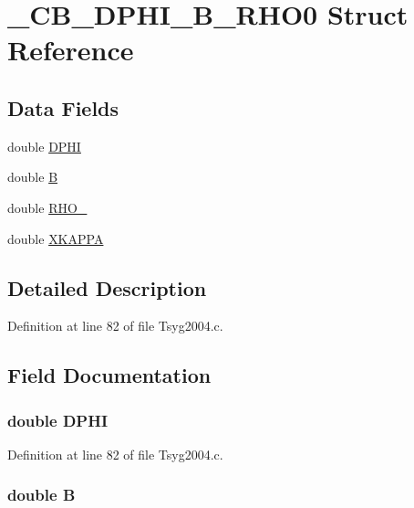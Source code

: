\hypertarget{struct___c_b___d_p_h_i___b___r_h_o0}{
\section{\_\-CB\_\-DPHI\_\-B\_\-RHO0 Struct Reference}
\label{struct___c_b___d_p_h_i___b___r_h_o0}
}
\subsection*{Data Fields}
\begin{CompactItemize}
\item 
double \hyperlink{struct___c_b___d_p_h_i___b___r_h_o0_bfa5828793e470e32c7cd371b5d698d4}{DPHI}
\item 
double \hyperlink{struct___c_b___d_p_h_i___b___r_h_o0_df085adbf76beb194ac436d42cd1d725}{B}
\item 
double \hyperlink{struct___c_b___d_p_h_i___b___r_h_o0_aaec50d7de5ec25604a887bb774a5ad2}{RHO\_}
\item 
double \hyperlink{struct___c_b___d_p_h_i___b___r_h_o0_c47e67864f6ce1555c7fbb0ca0429a1b}{XKAPPA}
\end{CompactItemize}


\subsection{Detailed Description}


Definition at line 82 of file Tsyg2004.c.

\subsection{Field Documentation}
\hypertarget{struct___c_b___d_p_h_i___b___r_h_o0_bfa5828793e470e32c7cd371b5d698d4}{
\subsubsection[{DPHI}]{\setlength{\rightskip}{0pt plus 5cm}double {\bf DPHI}}}
\label{struct___c_b___d_p_h_i___b___r_h_o0_bfa5828793e470e32c7cd371b5d698d4}




Definition at line 82 of file Tsyg2004.c.\hypertarget{struct___c_b___d_p_h_i___b___r_h_o0_df085adbf76beb194ac436d42cd1d725}{
\subsubsection[{B}]{\setlength{\rightskip}{0pt plus 5cm}double {\bf B}}}
\label{struct___c_b___d_p_h_i___b___r_h_o0_df085adbf76beb194ac436d42cd1d725}




